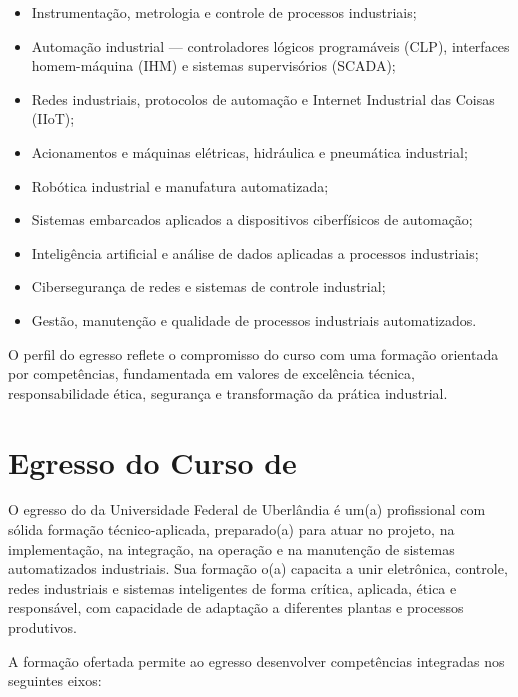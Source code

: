 \begin{itemize}
    \item Instrumentação, metrologia e controle de processos industriais;
    \item Automação industrial — controladores lógicos programáveis (CLP), interfaces homem-máquina (IHM) e sistemas supervisórios (SCADA);
    \item Redes industriais, protocolos de automação e Internet Industrial das Coisas (IIoT);
    \item Acionamentos e máquinas elétricas, hidráulica e pneumática industrial;
    \item Robótica industrial e manufatura automatizada;
    \item Sistemas embarcados aplicados a dispositivos ciberfísicos de automação;
    \item Inteligência artificial e análise de dados aplicadas a processos industriais;
    \item Cibersegurança de redes e sistemas de controle industrial;
    \item Gestão, manutenção e qualidade de processos industriais automatizados.
\end{itemize}

O perfil do egresso reflete o compromisso do curso com uma formação orientada por competências, fundamentada em valores de excelência técnica, responsabilidade ética, segurança e transformação da prática industrial.

\section{Egresso do Curso de \ppccurso}

O egresso do \ppccurso da Universidade Federal de Uberlândia é um(a) profissional com sólida formação técnico-aplicada, preparado(a) para atuar no projeto, na implementação, na integração, na operação e na manutenção de sistemas automatizados industriais. Sua formação o(a) capacita a unir eletrônica, controle, redes industriais e sistemas inteligentes de forma crítica, aplicada, ética e responsável, com capacidade de adaptação a diferentes plantas e processos produtivos.

A formação ofertada permite ao egresso desenvolver competências integradas nos seguintes eixos:

